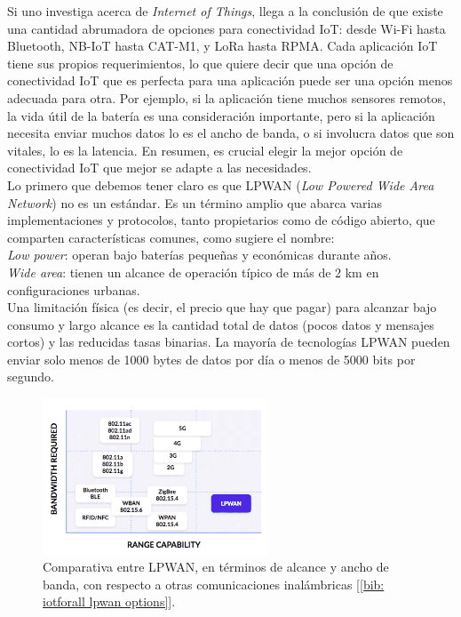 \documentclass[12pt]{article}
\begin{document}
	\noindent Si uno investiga acerca de \textit{Internet of Things}, llega a la conclusión de que existe una cantidad abrumadora de opciones para conectividad IoT: desde Wi-Fi hasta Bluetooth, NB-IoT hasta CAT-M1, y LoRa hasta RPMA. Cada aplicación IoT tiene sus propios requerimientos, lo que quiere decir que una opción de conectividad IoT que es perfecta para una aplicación puede ser una opción menos adecuada para otra. Por ejemplo, si la aplicación tiene muchos sensores remotos, la vida útil de la batería es una consideración importante, pero si la aplicación necesita enviar muchos datos lo es el ancho de banda, o si involucra datos que son vitales, lo es la latencia. En resumen, es crucial elegir la mejor opción de conectividad IoT que mejor se adapte a las necesidades. \\
	
	\noindent Lo primero que debemos tener claro es que LPWAN (\textit{Low Powered Wide Area Network}) no es un estándar. Es un término amplio que abarca varias implementaciones y protocolos, tanto propietarios como de código abierto, que comparten características comunes, como sugiere el nombre: \\
	
	\noindent \textit{Low power}: operan bajo baterías pequeñas y económicas durante años. \\
	
	\noindent \textit{Wide area}: tienen un alcance de operación típico de más de 2 km en configuraciones urbanas.\\
	
	\noindent Una limitación física (es decir, el precio que hay que pagar) para alcanzar bajo consumo y largo alcance es la cantidad total de datos (pocos datos y mensajes cortos) y las reducidas tasas binarias. La mayoría de tecnologías LPWAN pueden enviar solo menos de 1000 bytes de datos por día o menos de 5000 bits por segundo. \\
	
	\begin{figure}[h]
		\begin{center}
			\includegraphics[width=0.6\textwidth]{img/LPWAN_comp.png}
			\caption{Comparativa entre LPWAN, en términos de alcance y ancho de banda, con respecto a otras comunicaciones inalámbricas [\ref{bib: iotforall lpwan options}].}
			\label{LPWANs vs otros}
		\end{center}
	\end{figure}
\end{document}
